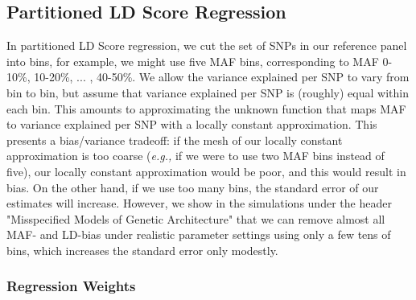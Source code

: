 \documentclass[11pt]{article}
\numberwithin{equation}{section}
\begin{document}
\subsection{Partitioned LD Score Regression}

In partitioned LD Score regression, we cut the set of SNPs in our reference panel into bins, for example,
we might use five MAF bins, corresponding to MAF 0-10\%, 10-20\%, ... , 40-50\%. 
We allow the variance explained per SNP to vary from bin to bin, but assume that variance explained per SNP is (roughly) 
equal within each bin. 
This amounts to approximating the unknown function that maps MAF to variance explained per SNP with a locally 
constant approximation. 
This presents a bias/variance tradeoff: if the mesh of our locally constant approximation is too coarse (\emph{e.g.,} if we were to use two MAF bins instead of five), our locally constant approximation would be poor, and this would result in bias. 
On the other hand, if we use too many bins, the standard error of our estimates will increase. 
However, we show in the simulations under the header "Misspecified Models of Genetic Architecture" that
we can remove almost all MAF- and LD-bias under realistic parameter settings using only a few tens of bins, which 
increases the standard error only modestly.


\subsubsection{Regression Weights} 
\end{document}
